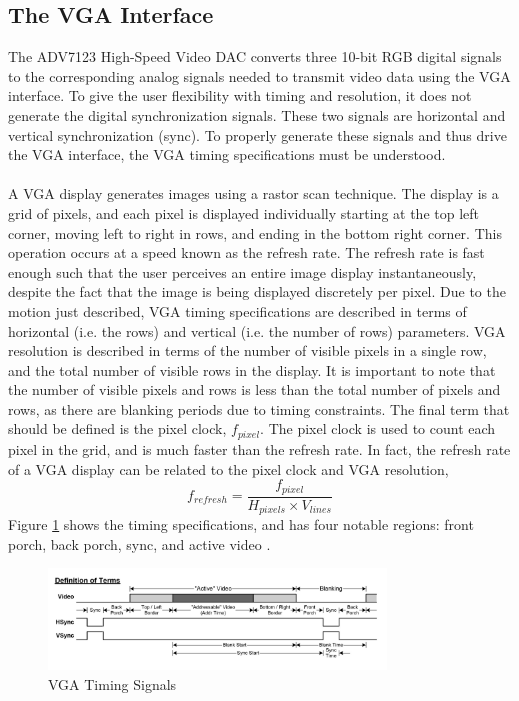 \documentclass[11pt]{article} %
\begin{document}
\subsection{The VGA Interface}
The ADV7123 High-Speed Video DAC converts three 10-bit RGB digital signals to the corresponding analog signals needed to transmit video data using the VGA interface. To give the user flexibility with timing and resolution, it does not generate the digital synchronization signals. These two signals are horizontal and vertical synchronization (sync). To properly generate these signals and thus drive the VGA interface, the VGA timing specifications must be understood. \\\\ 
A VGA display generates images using a rastor scan technique. The display is a grid of pixels, and each pixel is displayed individually starting at the top left corner, moving left to right in rows, and ending in the bottom right corner. This operation occurs at a speed known as the refresh rate. The refresh rate is fast enough such that the user perceives an entire image display instantaneously, despite the fact that the image is being displayed discretely per pixel. Due to the motion just described, VGA timing specifications are described in terms of horizontal (i.e. the rows) and vertical (i.e. the number of rows) parameters. VGA resolution is described in terms of the number of visible pixels in a single row, and the total number of visible rows in the display. It is important to note that the number of visible pixels and rows is less than the total number of pixels and rows, as there are blanking periods due to timing constraints. The final term that should be defined is the pixel clock, $f_{pixel}$. The pixel clock is used to count each pixel in the grid, and is much faster than the refresh rate. In fact, the refresh rate of a VGA display can be related to the pixel clock and VGA resolution,
\begin{equation}
f_{refresh} = \frac{f_{pixel}}{H_{pixels} \times V_{lines}}
\end{equation}
 Figure \ref{fig:vgaTiming} shows the timing specifications, and has four notable regions: front porch, back porch, sync, and active video \cite{16}. 
\begin{figure}[h]
\centering
\includegraphics[width=0.8\textwidth]{./images/vgaTiming.jpg}
\caption{VGA Timing Signals \cite{16}}
\label{fig:vgaTiming}
\end{figure}
\end{document}
